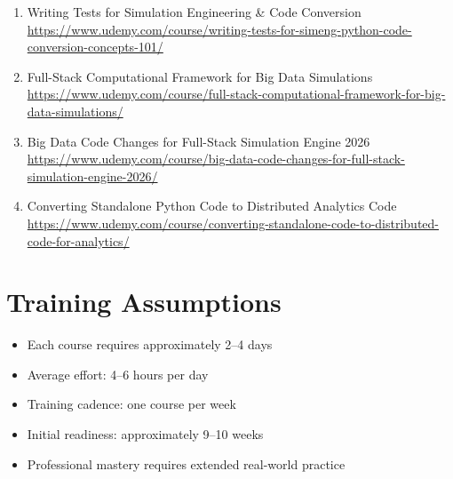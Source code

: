 \documentclass[12pt]{article}
\begin{document}
\begin{enumerate}[label=\textbf{Course \arabic*:}]
	\item Writing Tests for Simulation Engineering \& Code Conversion \\
	\href{https://www.udemy.com/course/writing-tests-for-simeng-python-code-conversion-concepts-101/}
	{https://www.udemy.com/course/writing-tests-for-simeng-python-code-conversion-concepts-101/}
	
	\item Full-Stack Computational Framework for Big Data Simulations \\
	\href{https://www.udemy.com/course/full-stack-computational-framework-for-big-data-simulations/}
	{https://www.udemy.com/course/full-stack-computational-framework-for-big-data-simulations/}
	
	\item Big Data Code Changes for Full-Stack Simulation Engine 2026 \\
	\href{https://www.udemy.com/course/big-data-code-changes-for-full-stack-simulation-engine-2026/}
	{https://www.udemy.com/course/big-data-code-changes-for-full-stack-simulation-engine-2026/}
	
	\item Converting Standalone Python Code to Distributed Analytics Code \\
	\href{https://www.udemy.com/course/converting-standalone-code-to-distributed-code-for-analytics/}
	{https://www.udemy.com/course/converting-standalone-code-to-distributed-code-for-analytics/}
\end{enumerate}
	
	\section*{Training Assumptions}
	
	\begin{itemize}
		\item Each course requires approximately 2–4 days
		\item Average effort: 4–6 hours per day
		\item Training cadence: one course per week
		\item Initial readiness: approximately 9–10 weeks
		\item Professional mastery requires extended real-world practice
	\end{itemize}
	
	\newpage
	
\end{document}

